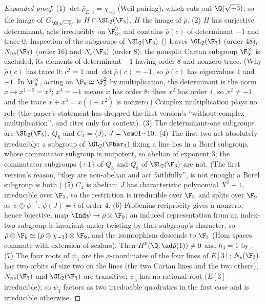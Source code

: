 \begin{sloppypar}
\begin{proof}[Expanded proof]
(1) $\det\bar\rho_{E,3}=\chi_{-3}$ (Weil pairing), which cuts out $\Q(\sqrt{-3})$; so the image of $G_{\Q(\sqrt{-3})}$ is $H\cap\SL_2(\F_3)$, $H$ the image of $\bar\rho$. (2) $H$ has surjective
determinant, acts irreducibly on $\F_3^2$, and contains $\bar\rho(c)$ of determinant $-1$ and trace $0$. Inspection of the subgroups of $\GL_2(\F_3)$ () leaves $\GL_2(\F_3)$
(order $48$), $N_{ns}(\F_3)$ (order $16$) and $N_s(\F_3)$ (order $8$); the nonsplit Cartan subgroup $\F_9^\times$ is excluded, its elements of determinant $-1$ having order $8$ and nonzero
trace. (Why $\bar\rho(c)$ has trace $0$: $c^2=1$ and $\det\bar\rho(c)=-1$, so $\bar\rho(c)$ has eigenvalues $1$ and $-1$. In $\F_9^\times$, acting on $\F_9\simeq\F_3^2$ by multiplication, the determinant
is the norm $x\mapsto x^{1+3}=x^4$; $x^4=-1$ means $x$ has order $8$; then $x^2$ has order $4$, so $x^2\ne-1$, and the trace $x+x^3=x(1+x^2)$ is nonzero.) Complex multiplication plays no role (the paper's statement has dropped the first version's ``without complex multiplication'', and cites \cite{Zywina15} only for context).
(3) The determinant-one subgroups are $\SL_2(\F_3)$, $Q_8$ and $C_4=\langle J\rangle$, $J=\sm01{-1}0$. (4) The first two act absolutely irreducibly: a subgroup of $\GL_2(\Fbar_3)$ fixing a line lies
in a Borel subgroup, whose commutator subgroup is unipotent, so abelian of exponent $3$; the commutator subgroups $\{\pm1\}$ of $Q_8$ and $Q_8$ of $\SL_2(\F_3)$ are not. (The first
version's reason, ``they are non-abelian and act faithfully'', is not enough: a Borel subgroup is both.) (5) $C_4$ is abelian; $J$ has characteristic polynomial $X^2+1$, irreducible over $\F_3$, so the
restriction is irreducible over $\F_3$ and splits over $\F_9$ as $\psi\oplus\psi^{-1}$, $\psi(J)=i$ of order $4$. (6) Frobenius reciprocity gives a nonzero, hence bijective, map
$\Ind\psi\to\bar\rho\otimes\F_9$; an induced representation from an index-two subgroup is invariant under twisting by that subgroup's character, so $\bar\rho\otimes\F_9\simeq(\bar\rho\otimes\chi_{-3})\otimes\F_9$,
and the isomorphism descends to $\F_3$ (Hom spaces commute with extension of scalars). Then $H^0(\Q,\ad\bar\rho(1))\ne0$ and $h_3=1$ by . (7) The four roots of $\psi_3$ are the
$x$-coordinates of the four lines of $E[3]$; $N_s(\F_3)$ has two orbits of size two on the lines (the two Cartan lines and the two others), $N_{ns}(\F_3)$ and $\GL_2(\F_3)$ are transitive;
$\psi_3$ has no rational root ($E[3]$ irreducible); so $\psi_3$ factors as two irreducible quadratics in the first case and is irreducible otherwise.
\end{proof}


\end{sloppypar}

